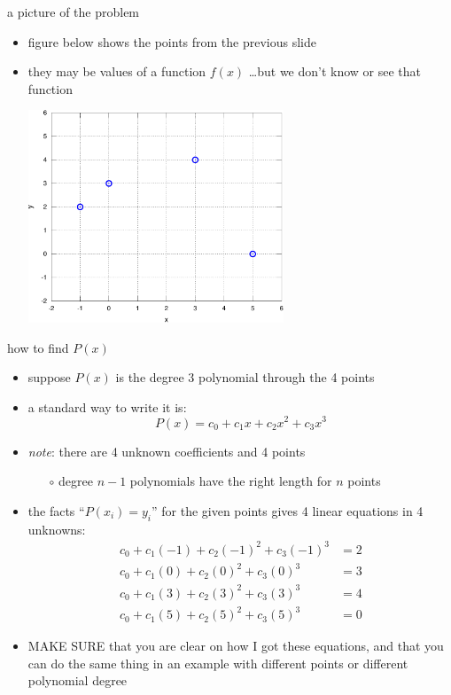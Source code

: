 \documentclass[10pt,hyperref]{beamer}
\newcommand{\MS}{\alert{MAKE SURE}\xspace}
\begin{document}
\begin{frame}{a picture of the problem}

\begin{itemize}
\item figure below shows the points from the previous slide
\item they may be values of a function $f(x)$ \dots but we don't know or see that function

\medskip
  \begin{center}
  \includegraphics[width=0.6\textwidth]{ex1}
  \end{center}
\end{itemize}
\end{frame}


\begin{frame}{how to find $P(x)$}

\begin{itemize}
\item suppose $P(x)$ is the degree 3 polynomial through the 4 points
\item a standard way to write it is:
	$$P(x) = c_0 + c_1 x + c_2 x^2 + c_3 x^3$$
\item \emph{note}: there are 4 unknown coefficients and 4 points
  \begin{itemize}
  \item[$\circ$] degree $n-1$ polynomials have the right length for $n$ points
  \end{itemize}
\item the facts ``$P(x_i)=y_i$'' for the given points gives 4 linear equations in 4 unknowns:
\begin{align*}
c_0 + c_1 (-1) + c_2 (-1)^2 + c_3 (-1)^3 &= 2 \\
c_0 + c_1 (0) + c_2 (0)^2 + c_3 (0)^3 &= 3 \\
c_0 + c_1 (3) + c_2 (3)^2 + c_3 (3)^3 &= 4 \\
c_0 + c_1 (5) + c_2 (5)^2 + c_3 (5)^3 &= 0
\end{align*}
\item \MS that you are clear on how I got these equations, and that you can do the same thing in an example with different points or different polynomial degree
\end{itemize}
\end{frame}
\end{document}
